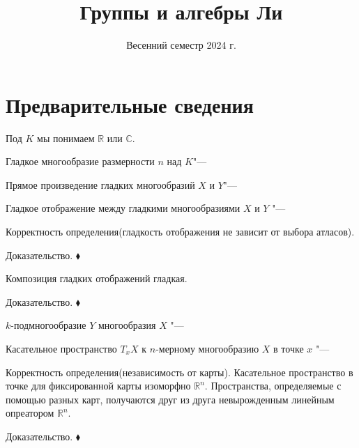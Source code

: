 


	\title{Группы и алгебры Ли}
	\date{Весенний семестр 2024 г.}
	\maketitle{}
	\vspace{14cm}
	\section{Предварительные сведения}
	Под $K$ мы понимаем $\mathds{R}$ или $\mathds{C}$.
	
	\begin{definition} Гладкое многообразие размерности $n$ над $K$"--- \end{definition}
	
	\begin{definition} Прямое произведение гладких многообразий $X$ и $Y$"--- \end{definition}
	
	\begin{definition} Гладкое отображение между гладкими многообразиями $X$ и $Y$ "--- \end{definition}
	
	\begin{statement} Корректность определения(гладкость отображения не зависит от выбора атласов). \end{statement}
	Доказательство. $\blacklozenge$
	
	\begin{statement} Композиция гладких отображений гладкая. \end{statement}
	Доказательство. $\blacklozenge$
	
	\begin{definition} $k$-подмногообразие $Y$ многообразия $X$ "--- \end{definition}
	
	\begin{definition} Касательное пространство $T_x X$ к $n$-мерному многообразию $X$ в точке $x$ "--- \end{definition}
	
	\begin{theorem} Корректность определения(независимость от карты). Касательное пространство в точке для фиксированной карты изоморфно $\mathds{R}^n$. Пространства, определяемые с помощью разных карт, получаются друг из друга невырожденным линейным опреатором $\mathds{R}^n$. \end{theorem}
	Доказательство. $\blacklozenge$
	
